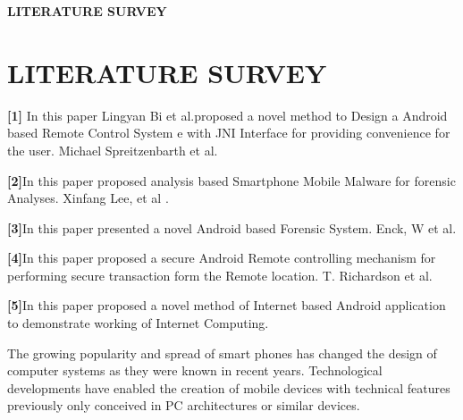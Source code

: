 \documentclass[12pt]{article}
\begin{document}
\clearpage





\begin{center}
 
 \Large \textbf{LITERATURE SURVEY}\\[10mm]
 \end{center}
 \section{LITERATURE SURVEY}\par
\textbf{[1]} In this paper Lingyan Bi et al.proposed a novel method to Design a Android
based Remote Control System e with JNI Interface for providing convenience for
the user. Michael Spreitzenbarth et al.\par
\textbf{[2]}In this paper proposed analysis based Smartphone Mobile Malware for forensic
Analyses. Xinfang Lee, et al .\par
\textbf{[3]}In this paper presented a novel Android based Forensic System. Enck, W et al.\par
\textbf{[4]}In this paper proposed a secure Android Remote controlling mechanism for
performing secure transaction form the Remote location. T. Richardson et al.\par
\textbf{[5]}In this paper proposed a novel method of Internet based Android application
to demonstrate working of Internet Computing.\\[2mm]\par

The growing popularity and spread of smart phones has changed the design of
computer systems as they were known in recent years. Technological
developments have enabled the creation of mobile devices with technical features
previously only conceived in PC architectures or similar devices.


\clearpage
\end{document}

